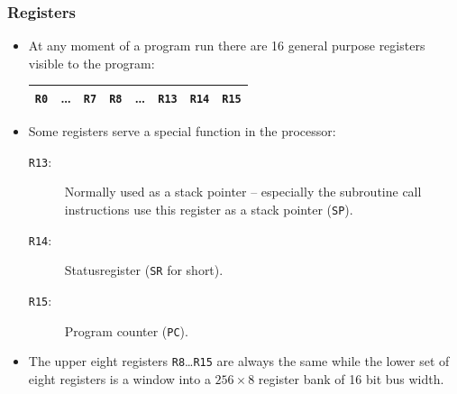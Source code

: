 \documentclass{beamer}
\begin{document}
%
   \begin{frame}
    \frametitle{Registers}
    \begin{itemize}
     \item At any moment of a program run there are 16 general purpose 
      registers visible to the program:
      \begin{center}
       \begin{tabular}{|c|c|c||c|c|c|c|c|}
        \hline
         {\tt R0}&\dots&{\tt R7}&{\tt R8}&\dots&{\tt R13}&{\tt R14}&{\tt R15}\\
        \hline
       \end{tabular}
      \end{center}
     \item Some registers serve a special function in the processor:
      \begin{description}
       \item [{\tt R13}:] Normally used as a stack pointer -- especially the
        subroutine call instructions use this register as a stack pointer
        (\texttt{SP}).
       \item [{\tt R14}:] Statusregister ({\tt SR} for short).
       \item [{\tt R15}:] Program counter (\texttt{PC}).
      \end{description}
     \item The upper eight registers {\tt R8}\dots{\tt R15} are always the
      same while the lower set of eight registers is a window
      into a $256\times 8$ register bank of 16 bit bus width.
    \end{itemize}
   \end{frame}
%
\end{document}
